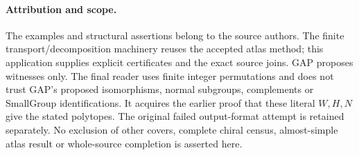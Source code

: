 \documentclass[11pt,a4paper]{article}
\begin{document}
\paragraph{Attribution and scope.}
The examples and structural assertions belong to the source authors.
The finite transport/decomposition machinery reuses the accepted atlas
method; this application supplies explicit certificates and the exact
source joins. GAP proposes witnesses only. The final reader uses finite
integer permutations and does not trust GAP's proposed isomorphisms,
normal subgroups, complements or SmallGroup identifications. It acquires
the earlier proof that these literal $W,H,N$ give the stated polytopes.
The original failed output-format attempt is retained separately.
No exclusion of other covers, complete chiral census, almost-simple
atlas result or whole-source completion is asserted here.
\end{document}
